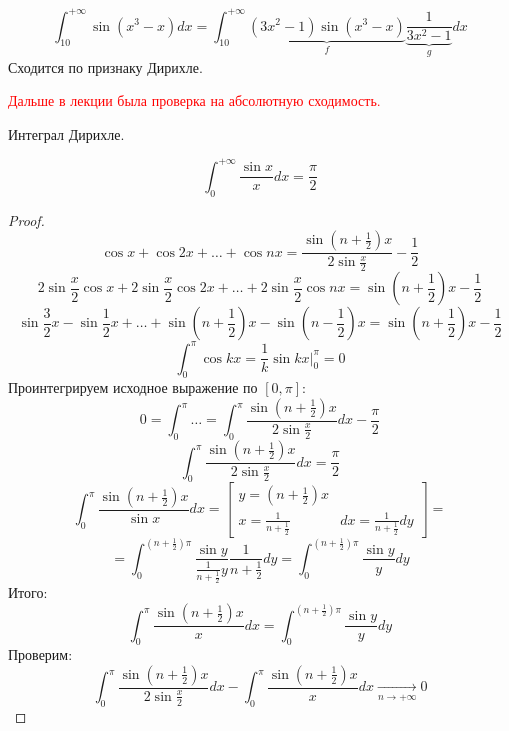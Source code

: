 \begin{exercise}
    $$\int_{10}^{+\infty} \sin(x^3-x) dx = \int_{10}^{+\infty} \underbrace{(3x^2-1)\sin(x^3-x)}_{f}\underbrace{\frac{1}{3x^2-1}}_{g}dx$$
    Сходится по признаку Дирихле.
    
    \textcolor{red}{Дальше в лекции была проверка на абсолютную сходимость.}
\end{exercise}

\begin{example}
    Интеграл Дирихле.

    $$\int_0^{+\infty} \frac{\sin x}{x}dx = \frac{\pi}{2}$$
\end{example}
\begin{proof}
    $$\cos x + \cos 2x + \ldots + \cos nx = \frac{\sin\left(n+\frac{1}{2}\right)x}{2\sin \frac{x}{2}}-\frac{1}{2}$$
    $$2\sin \frac{x}{2}\cos x + 2\sin \frac{x}{2}\cos 2x + \ldots + 2\sin \frac{x}{2}\cos nx = \sin\left(n+\frac{1}{2}\right)x -\frac{1}{2}$$
    $$\sin\frac{3}{2}x-\sin\frac{1}{2}x+\ldots+\sin\left(n+\frac{1}{2}\right)x - \sin\left(n-\frac{1}{2}\right)x = \sin\left(n+\frac{1}{2}\right)x -\frac{1}{2}$$
    $$\int_0^\pi \cos kx = \frac{1}{k}\sin kx\Big|_0^\pi=0$$
    Проинтегрируем исходное выражение по $[0, \pi]$:
    $$0=\int_0^\pi\ldots=\int_0^\pi \frac{\sin\left(n+\frac{1}{2}\right)x}{2\sin\frac{x}{2}}dx-\frac{\pi}{2}$$
    $$\int_0^\pi \frac{\sin\left(n+\frac{1}{2}\right)x}{2\sin\frac{x}{2}}dx=\frac{\pi}{2}$$
    $$\int_0^\pi \frac{\sin\left(n+\frac{1}{2}\right)x}{\sin x}dx = \left[\begin{array}{ll}
        y = \left(n+\frac{1}{2}\right)x &\\
        x = \frac{1}{n+\frac{1}{2}} & dx = \frac{1}{n+\frac{1}{2}}dy
    \end{array}\right] = $$
    $$ = \int_0^{\left(n+\frac{1}{2}\right)\pi} \frac{\sin y}{\frac{1}{n+\frac{1}{2}}y}\frac{1}{n+\frac{1}{2}}dy = \int_0^{\left(n+\frac{1}{2}\right)\pi} \frac{\sin y}{y}dy$$
    Итого:
    $$\int_0^\pi \frac{\sin\left(n+\frac{1}{2}\right)x}{x}dx = \int_0^{\left(n+\frac{1}{2}\right)\pi} \frac{\sin y}{y}dy$$
    Проверим:
    $$\int_0^\pi \frac{\sin\left(n+\frac{1}{2}\right)x}{2\sin\frac{x}{2}}dx -  \int_0^\pi \frac{\sin\left(n+\frac{1}{2}\right)x}{x}dx \xrightarrow[n\to+\infty]{} 0$$


\end{proof}
